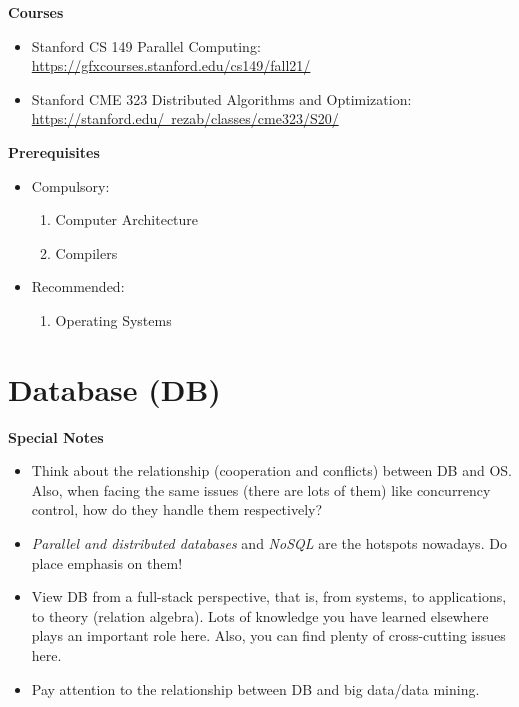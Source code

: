 \documentclass{article}
\begin{document}
\textbf{Courses}
\begin{itemize}
    \item Stanford CS 149 Parallel Computing:
    \href{https://gfxcourses.stanford.edu/cs149/fall21/}{https://gfxcourses.stanford.edu/cs149/fall21/}
    \item Stanford CME 323 Distributed Algorithms and Optimization:\\
    \href{https://stanford.edu/~rezab/classes/cme323/S20/}{https://stanford.edu/~rezab/classes/cme323/S20/}
\end{itemize}
\textbf{Prerequisites}
    \begin{itemize}
        \item Compulsory:
        \begin{enumerate}
        \item Computer Architecture
        \item Compilers
    \end{enumerate}
        \item Recommended:
        \begin{enumerate}
            \item Operating Systems
        \end{enumerate}
    \end{itemize}

\section{Database (DB)}
\textbf{Special Notes}
\begin{itemize}
    \item Think about the relationship (cooperation and conflicts) between DB and OS.
    Also, when facing the same issues (there are lots of them) like concurrency control, how do they handle them respectively?
    \item \emph{Parallel and distributed databases} and \emph{NoSQL} are the hotspots nowadays.
    Do place emphasis on them!
    \item View DB from a full-stack perspective, that is, from systems, to applications, to theory (relation algebra).
    Lots of knowledge you have learned elsewhere plays an important role here.
    Also, you can find plenty of cross-cutting issues here.
    \item Pay attention to the relationship between DB and big data/data mining.
\end{itemize}
\end{document}
